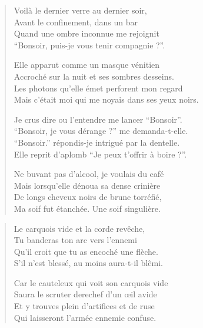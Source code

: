 \begin{verse}\quatrain%
  Voilà le dernier verre au dernier soir,\\  
  Avant le confinement, dans un bar\\ 
  Quand une ombre inconnue me rejoignit\\ 
  \enquote{\newcharacterspeaks{}Bonsoir, puis-je vous tenir compagnie ?}. %

  Elle apparut  comme un masque vénitien\\ 
  Accroché sur la nuit et ses sombres desseins.\\ 
  Les photons qu’elle émet perforent mon regard\\ 
  Mais c’était moi qui me noyais dans ses yeux noirs. %

  Je crus dire ou l’entendre me lancer \enquote{\newcharacterspeaks{}Bonsoir}.\\ 
  \enquote{\newcharacterspeaks{}Bonsoir, je vous dérange ?} me demanda-t-elle.\\ 
  \enquote{\newcharacterspeaks{}Bonsoir.} répondis-je intrigué par la dentelle.\\ 
  Elle reprit d’aplomb \enquote{\newcharacterspeaks{}Je peux t’offrir à boire ?}. %

  Ne buvant pas d’alcool, je voulais du café\\ 
  Mais lorsqu’elle dénoua sa dense crinière\\ 
  De longs  cheveux noirs de brune torréfié,\\ 
  Ma soif fut étanchée. Une soif singulière. %
\end{verse}

\begin{verse}\quatrain
  Le carquois vide et la corde revêche,\\ 
  Tu banderas ton arc vers l’ennemi\\ 
  Qu’il croit que tu as encoché une flèche.\\ 
  S’il n’est blessé, au moins aura-t-il blêmi.  %

  Car le cauteleux qui voit son carquois vide\\ 
  Saura le scruter derechef d’un œil avide\\ 
  Et y trouves plein d’artifices et de ruse\\ 
  Qui laisseront l’armée ennemie confuse.  %
\end{verse}

